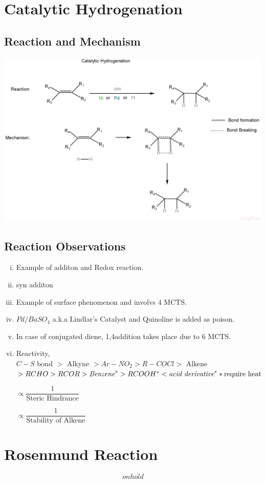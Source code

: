 \documentclass{article}
\begin{document}
\section{Catalytic Hydrogenation}
\subsection{Reaction and Mechanism}
\includegraphics[scale=0.24]{p_jpg.JPEG}
\subsection{Reaction Observations}
\begin{enumerate}[i.]
    \item Example of additon and Redox reaction.
    \item syn additon
    \item Example of surface phenomenon and involvs $4$ MCTS.
    \item $Pd / BaSO_{4}$ a.k.a Lindlar's Catalyst and Quinoline is added as poison.
    \item In case of conjugated diene, 1,4addition takes place due to $6$ MCTS.
    \item Reactivity, \\
          $C-S$ bond $>$ Alkyne $> Ar-NO_{2} > R-COCl>$ Alkene $> RCHO> RCOR> \textit{Benzene}^*>RCOOH^*< \textit{acid derivative}^* \hfill * \text{require heat}$

          $\propto \dfrac{1}{\text{Steric Hindrance}}$

          $\propto \dfrac{1}{\text{Stability of Alkene}}$
\end{enumerate}

\section{Rosenmund Reaction}
$$on hold$$
\end{document}
